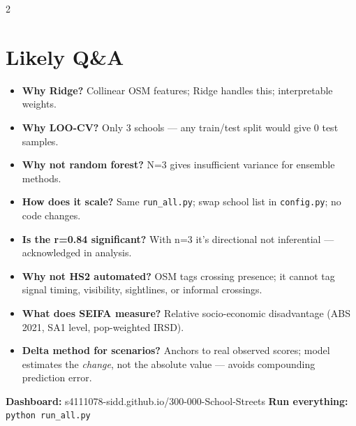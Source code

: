 \documentclass[9pt,a4paper]{extarticle}
\newcommand{\kw}[1]{\textbf{\color{DG}#1}}
\begin{document}
\begin{multicols}{2}
\section{Likely Q\&A}

\begin{itemize}
  \item \kw{Why Ridge?} Collinear OSM features; Ridge handles this; interpretable weights.
  \item \kw{Why LOO-CV?} Only 3 schools --- any train/test split would give 0 test samples.
  \item \kw{Why not random forest?} N=3 gives insufficient variance for ensemble methods.
  \item \kw{How does it scale?} Same \texttt{run\_all.py}; swap school list in \texttt{config.py}; no code changes.
  \item \kw{Is the r=0.84 significant?} With n=3 it's directional not inferential --- acknowledged in analysis.
  \item \kw{Why not HS2 automated?} OSM tags crossing presence; it cannot tag signal timing, visibility, sightlines, or informal crossings.
  \item \kw{What does SEIFA measure?} Relative socio-economic disadvantage (ABS 2021, SA1 level, pop-weighted IRSD).
  \item \kw{Delta method for scenarios?} Anchors to real observed scores; model estimates the \emph{change}, not the absolute value --- avoids compounding prediction error.
\end{itemize}

\end{multicols}

\vspace{4pt}
\colorbox{DG}{\parbox{\linewidth}{%
  \vspace{3pt}\hspace{6pt}%
  {\color{LG}\small\textbf{Dashboard:} s4111078-sidd.github.io/300-000-School-Streets}%
  \hfill%
  {\color{white}\small\textbf{Run everything:} \texttt{python run\_all.py}}%
  \hspace{6pt}\vspace{3pt}%
}}
\end{document}
